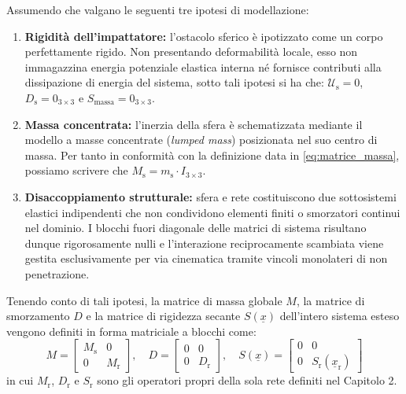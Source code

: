 Assumendo che valgano le seguenti tre ipotesi di modellazione:
\begin{enumerate}
  \item \textbf{Rigidità dell'impattatore:} l'ostacolo sferico è ipotizzato come un corpo perfettamente rigido. Non presentando deformabilità locale, esso non immagazzina energia potenziale elastica interna né fornisce contributi alla dissipazione di energia del sistema, sotto tali ipotesi si ha che: $\mathcal{U}_{\text{s}} = 0$, $D_{\text{s}} = 0_{3\times3}$ e $S_{\text{massa}} = 0_{3\times3}$. 
  \item \textbf{Massa concentrata:} l'inerzia della sfera è schematizzata mediante il modello a masse concentrate (\textit{lumped mass}) posizionata nel suo centro di massa. Per tanto in conformità con la definizione data in \eqref{eq:matrice_massa}, possiamo scrivere che $M_{\text{s}} = m_{\text{s}} \cdot I_{3\times3}$. 
  \item \textbf{Disaccoppiamento strutturale:} sfera e rete costituiscono due sottosistemi elastici indipendenti che non condividono elementi finiti o smorzatori continui nel dominio. I blocchi fuori diagonale delle matrici di sistema risultano dunque rigorosamente nulli e l'interazione reciprocamente scambiata viene gestita esclusivamente per via cinematica tramite vincoli monolateri di non penetrazione. 
\end{enumerate}

Tenendo conto di tali ipotesi, la matrice di massa globale $M$, la matrice di smorzamento $D$ e la matrice di rigidezza secante $S(\underline{x})$ dell'intero sistema esteso vengono definiti in forma matriciale a blocchi come:
\begin{equation}
  M = \begin{bmatrix} M_{\text{s}} & 0 \\ 0 & M_{\text{r}} \end{bmatrix}, \quad
  D = \begin{bmatrix} 0 & 0 \\ 0 & D_{\text{r}}\end{bmatrix}, \quad
  S(\underline{x}) = \begin{bmatrix} 0 & 0 \\ 0 & S_{\text{r}}(\underline{x}_{\text{r}}) \end{bmatrix}
  \label{eq:definizione_matrici_globali}
\end{equation}
in cui $M_{\text{r}}$, $D_{\text{r}}$ e $S_{\text{r}}$ sono gli operatori propri della sola rete definiti nel Capitolo 2. 

